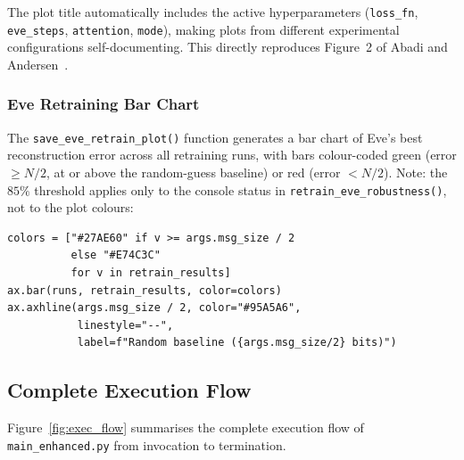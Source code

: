 \documentclass[12pt, a4paper]{article}
\newcommand{\code}[1]{\texttt{\color{CodeRed}#1}}
\begin{document}
The plot title automatically includes the active hyperparameters
(\code{loss\_fn}, \code{eve\_steps}, \code{attention}, \code{mode}),
making plots from different experimental configurations
self-documenting. This directly reproduces Figure~2 of
Abadi and Andersen~\cite{abadi2016learning}.

\subsubsection*{Eve Retraining Bar Chart}

The \code{save\_eve\_retrain\_plot()} function generates a bar chart
of Eve's best reconstruction error across all retraining runs, with
bars colour-coded green (error $\geq N/2$, at or above the
random-guess baseline) or red (error $< N/2$). Note: the $85\%$
threshold applies only to the console status in
\code{retrain\_eve\_robustness()}, not to the plot colours:

\begin{lstlisting}[caption={Eve retraining bar chart generation}]
colors = ["#27AE60" if v >= args.msg_size / 2
          else "#E74C3C"
          for v in retrain_results]
ax.bar(runs, retrain_results, color=colors)
ax.axhline(args.msg_size / 2, color="#95A5A6",
           linestyle="--",
           label=f"Random baseline ({args.msg_size/2} bits)")
\end{lstlisting}


\subsection{Complete Execution Flow}
\label{subsec:exec_flow}

Figure~\ref{fig:exec_flow} summarises the complete execution flow of
\code{main\_enhanced.py} from invocation to termination.
\end{document}
